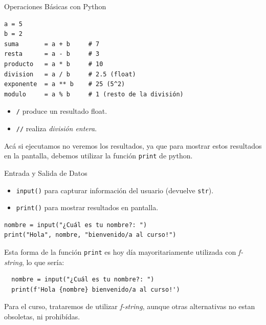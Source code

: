 \documentclass[10pt]{beamer}
\begin{document}
\begin{frame}[fragile]{Operaciones Básicas con Python}

  \begin{verbatim}
a = 5
b = 2
suma       = a + b     # 7
resta      = a - b     # 3
producto   = a * b     # 10
division   = a / b     # 2.5 (float)
exponente  = a ** b    # 25 (5^2)
modulo     = a % b     # 1 (resto de la división)
\end{verbatim}

\begin{itemize}
  \item \texttt{/} produce un resultado float.
  \item \texttt{//} realiza \emph{división entera}.
\end{itemize}

Acá si ejecutamos no veremos los resultados, ya que para mostrar estos resultados en la pantalla, debemos utilizar la función \texttt{print} de python.
\end{frame}

\begin{frame}[fragile]{Entrada y Salida de Datos}
\begin{itemize}
  \item \texttt{input()} para capturar información del usuario (devuelve \texttt{str}).
  \item \texttt{print()} para mostrar resultados en pantalla.
\end{itemize}
\begin{verbatim}
nombre = input("¿Cuál es tu nombre?: ")
print("Hola", nombre, "bienvenido/a al curso!")
\end{verbatim}

Esta forma de la función \texttt{print} es hoy día mayoritariamente utilizada con \textit{f-string}, lo que sería:

\begin{verbatim}
  nombre = input("¿Cuál es tu nombre?: ")
  print(f'Hola {nombre} bienvenido/a al curso!')
  \end{verbatim}

  Para el curso, trataremos de utilizar \textit{f-string}, aunque otras alternativas no estan obsoletas, ni prohibídas.
\end{frame}
\end{document}
